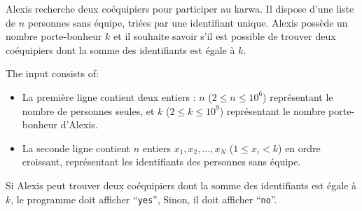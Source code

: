 \problemname{\problemyamlname}


\newcommand{\maxa}{123456789}

Alexis recherche deux coéquipiers pour participer au karwa. Il dispose d'une liste de $n$ personnes sans équipe, triées par une identifiant unique.
Alexis possède un nombre porte-bonheur $k$ et il souhaite savoir s'il est possible de trouver deux coéquipiers dont la somme des identifiants est égale à $k$.

\begin{Input}
	The input consists of:
	\begin{itemize}
		 \item La première ligne contient deux entiers : $n$ ($2 \le n \le 10^6$) représentant le nombre de personnes seules, et $k$ ($2 \le k \le 10^9$) représentant le nombre porte-bonheur d'Alexis.
		\item La seconde ligne contient $n$ entiers $x_1, x_2, \dots, x_N$ ($1 \le x_i < k$) en ordre croissant, représentant les identifiants des personnes sans équipe.
	\end{itemize}
\end{Input}

\begin{Output}
	Si Alexis peut trouver deux coéquipiers dont la somme des identifiants est égale à $k$, le programme doit afficher ``\verb|yes|'', Sinon, il doit afficher ``\verb|no|''.
\end{Output}
